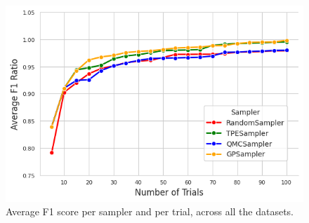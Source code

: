 \begin{figure}[t]
    \centering
\includegraphics[width=0.97\linewidth]{Nikoletos-paper/figures/predictions/average_f1_ratios_across_datasets.png}
    \caption{Average F1 score per sampler and per trial, across all the datasets.}
    \label{fig:mean-F1-samplers-performance-f1}
\end{figure}

